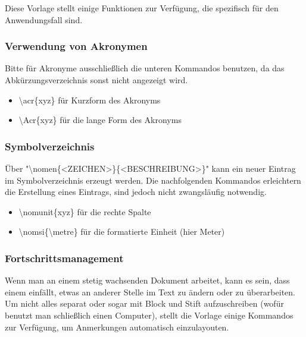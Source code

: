 Diese Vorlage stellt einige Funktionen zur Verfügung, die spezifisch für den Anwendungsfall sind.


\subsubsection{Verwendung von Akronymen}

Bitte für Akronyme ausschließlich die unteren Kommandos benutzen, da das Abkürzungsverzeichnis
sonst nicht angezeigt wird.

\begin{itemize}
  \item \textbackslash{}acr\{xyz\} für Kurzform des Akronyms
  \item \textbackslash{}Acr\{xyz\} für die lange Form des Akronyms
\end{itemize}

\subsubsection{Symbolverzeichnis}

Über "\textbackslash{}nomen\{<ZEICHEN>\}\{<BESCHREIBUNG>\}" kann ein neuer Eintrag im
Symbolverzeichnis erzeugt werden. Die nachfolgenden Kommandos erleichtern die Erstellung
eines Eintrags, sind jedoch nicht zwangsläufig notwendig.

\begin{itemize}
  \item \textbackslash{}nomunit\{xyz\} für die rechte Spalte
  \item \textbackslash{}nomsi\{\textbackslash{}metre\} für die formatierte Einheit (hier Meter)
\end{itemize}

\subsubsection{Fortschrittsmanagement}

Wenn man an einem stetig wachsenden Dokument arbeitet, kann es sein,
dass einem einfällt, etwas an anderer Stelle im Text zu ändern oder zu überarbeiten.
Um nicht alles separat oder sogar mit Block und Stift aufzuschreiben (wofür benutzt man schließlich
einen Computer), stellt die Vorlage einige Kommandos zur Verfügung, um Anmerkungen
automatisch einzulayouten.

